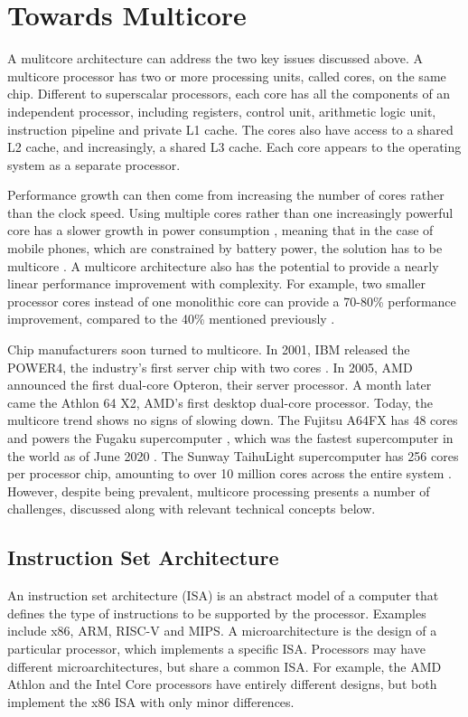 \documentclass[bsc,frontabs,singlespacing,parskip,deptreport]{infthesis}     %
\begin{document}
\section{Towards Multicore} \label{towards-multicore}
A mulitcore architecture can address the two key issues discussed above. A multicore processor has two or more processing units, called cores, on the same chip. Different to superscalar processors, each core has all the components of an independent processor, including registers, control unit, arithmetic logic unit, instruction pipeline and private L1 cache. The cores also have access to a shared L2 cache, and increasingly, a shared L3 cache. Each core appears to the operating system as a separate processor. 

Performance growth can then come from increasing the number of cores rather than the clock speed. Using multiple cores rather than one increasingly powerful core has a slower growth in power consumption \cite{blake_2009}, meaning that in the case of mobile phones, which are constrained by battery power, the solution has to be multicore \cite{berkel_2009}. A multicore architecture also has the potential to provide a nearly linear performance improvement with complexity. For example, two smaller processor cores instead of one monolithic core can provide a 70-80\% performance improvement, compared to the 40\% mentioned previously \cite{borkar_2007}.

Chip manufacturers soon turned to multicore. In 2001, IBM released the POWER4, the industry’s first server chip with two cores \cite{power4}. In 2005, AMD announced the first dual-core Opteron, their server processor. A month later came the Athlon 64 X2, AMD’s first desktop dual-core processor. Today, the multicore trend shows no signs of slowing down. The Fujitsu A64FX has 48 cores and powers the Fugaku supercomputer \cite{a64fx}, which was the fastest supercomputer in the world as of June 2020 \cite{top500}. The Sunway TaihuLight supercomputer has 256 cores per processor chip, amounting to over 10 million cores across the entire system \cite{sunway}. However, despite being prevalent, multicore processing presents a number of challenges, discussed along with relevant technical concepts below.

\subsection{Instruction Set Architecture} \label{architectural-challenges}
An instruction set architecture (ISA) is an abstract model of a computer that defines the type of instructions to be supported by the processor. Examples include x86, ARM, RISC-V and MIPS. A microarchitecture is the design of a particular processor, which implements a specific ISA. Processors may have different microarchitectures, but share a common ISA. For example, the AMD Athlon and the Intel Core processors have entirely different designs, but both implement the x86 ISA with only minor differences.
\end{document}
